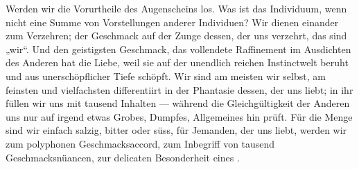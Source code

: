 Werden wir die Vorurtheile des Augenscheins los. Was ist das Individuum, wenn nicht eine Summe von Vorstellungen anderer Individuen? Wir dienen einander zum Verzehren; der Geschmack auf der Zunge dessen, der uns verzehrt, das sind „wir“. Und den geistigsten Geschmack, das vollendete Raffinement im Ausdichten des Anderen hat die Liebe, weil sie auf der unendlich reichen Instinctwelt beruht und aus unerschöpflicher Tiefe schöpft. Wir sind am meisten wir selbst, am feinsten und vielfachsten differentiirt in der Phantasie dessen, der uns liebt; in ihr füllen wir uns mit tausend Inhalten — während die Gleichgültigkeit der Anderen uns nur auf irgend etwas Grobes, Dumpfes, Allgemeines hin prüft. Für die Menge sind wir einfach salzig, bitter oder süss, für Jemanden, der uns liebt, werden wir zum polyphonen Geschmacksaccord, zum Inbegriff von tausend Geschmacksnüancen, zur delicaten Besonderheit eines .
\par


